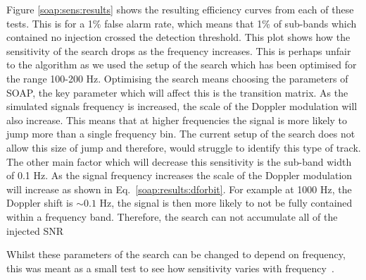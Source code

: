 Figure \ref{soap:sens:results} shows the resulting efficiency curves from each of these tests.
This is for a 1\% false alarm rate, which means that 1\% of sub-bands which contained no injection crossed the detection threshold. 
This plot shows how the sensitivity of the search drops as the frequency increases.
This is perhaps unfair to the algorithm as we used the setup of the search which has been optimised for the range 100-200 Hz.
Optimising the search means choosing the parameters of SOAP, the key parameter which will affect this is the transition matrix. 
As the simulated signals frequency is increased, the scale of the Doppler modulation will also increase.
This means that at higher frequencies the signal is more likely to jump more than a single frequency bin. 
The current setup of the search does not allow this size of jump and therefore, would struggle to identify this type of track.
The other main factor which will decrease this sensitivity is the sub-band width of 0.1 Hz. 
As the signal frequency increases the scale of the
Doppler modulation will increase as shown in Eq.~\ref{soap:results:dforbit}.
For example at 1000 Hz, the Doppler shift is $\sim 0.1$ Hz, the signal is then more likely to not be fully contained within a frequency band. 
Therefore, the search can not accumulate all of the injected \gls{SNR}

Whilst these parameters of the search can be changed to depend on frequency,
this was meant as a small test to see how sensitivity varies with
frequency~.


